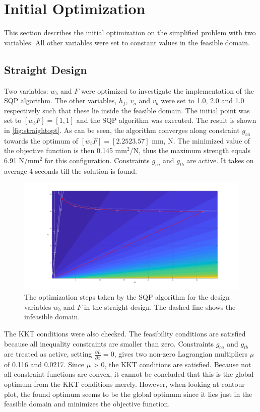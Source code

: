\section{Initial Optimization}
This section describes the initial optimization on the simplified problem with two variables. All other variables were set to constant values in the feasible domain. 
\subsection{Straight Design}
Two variables: $w_b$ and $F$ were optimized to investigate the implementation of the SQP algorithm. The other variables, $h_f$, $v_a$ and $v_b$ were set to 1.0, 2.0 and 1.0 respectively such that these lie inside the feasible domain. The initial point was set to $[w_b F] = [1, 1]$ and the SQP algorithm was executed. The result is shown in \autoref{fig:straightopt}. As can be seen, the algorithm converges along constraint $g_{ca}$ towards the optimum of $[w_b F] = [2.25 23.57]$ mm, N. The minimized value of the objective function is then 0.145 mm$^2$/N, thus the maximum strength equals 6.91 N/mm$^2$ for this configuration. Constraints $g_{ca}$ and $g_{tb}$ are active. It takes on average 4 seconds till the solution is found. 


\begin{figure}[H]
	\centering
	\includegraphics[width=\columnwidth]{sources/plots/straight2var.png}
	\caption{The optimization steps taken by the SQP algorithm for the design variables $w_b$ and $F$ in the straight design. The dashed line shows the infeasible domain.}
	\label{fig:straightopt}
\end{figure}


The KKT conditions were also checked. The feasibility conditions are satisfied because all inequality constraints are smaller than zero. Constraints $g_{ca}$ and $g_{tb}$ are treated as active, setting $\frac{\partial L}{\partial x} = 0$, gives two non-zero Lagrangian multipliers $\mu$ of 0.116 and 0.0217. Since $\mu$ > 0, the KKT conditions are satisfied. Because not all constraint functions are convex, it cannot be concluded that this is the global optimum from the KKT conditions merely. However, when looking at contour plot, the found optimum seems to be the global optimum since it lies just in the feasible domain and minimizes the objective function. 

